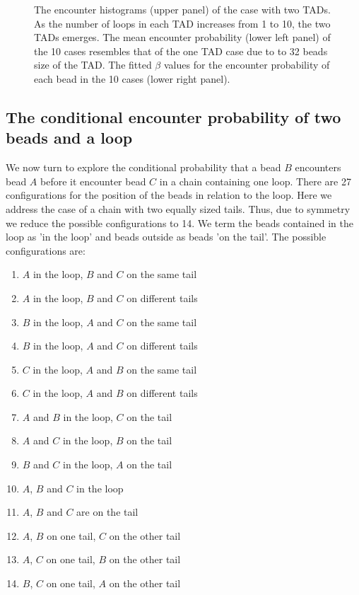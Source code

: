 \documentclass[12pt]{paper}
\begin{document}
\begin{figure}[H]
\caption{\scriptsize{The encounter histograms (upper panel) of the case with two TADs. As the number of loops in each TAD increases from 1 to 10, the two TADs emerges. The mean encounter probability (lower left panel) of the 10 cases resembles that of the one TAD case due to to 32 beads size of the TAD. The fitted $\beta$ values for the encounter probability of each bead in the 10 cases (lower right panel).}}
\end{figure}
 


\subsection{The conditional encounter probability of two beads and a loop}
We now turn to explore the conditional probability that a bead $B$ encounters bead $A$ before it encounter bead $C$ in a chain containing one loop. There are 27 configurations for the position of the beads in relation to the loop. Here we address the case of a chain with two equally sized tails. Thus, due to symmetry we reduce the possible configurations to 14. We term the beads contained in the loop as 'in the loop' and beads outside as beads 'on the tail'. The possible configurations are: 
\begin{enumerate}
\item $A$ in the loop, $B$ and $C$ on the same tail
\item $A$ in the loop, $B$ and $C$ on different tails
\item $B$ in the loop, $A$ and $C$ on the same tail
\item $B$ in the loop, $A$ and $C$ on different tails
\item $C$ in the loop, $A$ and $B$ on the same tail 
\item $C$ in the loop, $A$ and $B$ on different tails 
\item $A$ and $B$ in the loop, $C$ on the tail 
\item $A$ and $C$ in the loop, $B$ on the tail 
\item $B$ and $C$ in the loop, $A$ on the tail 
\item $A$, $B$ and $C$ in the loop
\item $A$, $B$ and $C$ are on the tail
\item $A$, $B$ on one tail, $C$ on the other tail
\item $A$, $C$ on one tail, $B$ on the other tail
\item $B$, $C$ on one tail, $A$ on the other tail
\end{enumerate}
\end{document}
